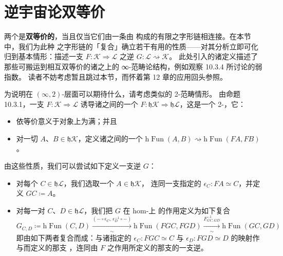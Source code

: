 \providecommand{\Fun}{\operatorname{Fun}}
\providecommand{\QCat}{\mathcal{Q}\mathcal{C}at}

\section{逆宇宙论双等价}\label{sec:inverse-cosmological-biequivalences}

两个\trInfinityCosmos{}是\textbf{双等价的}，当且仅当它们由一条由%
\trCosmologicalBiequivalence{}构成的有限之字形链相连接。在本节中，我们为此种
之字形链的「复合」确立若干有用的性质——对其分析立即可化归到基本情形：描述一支%
\trCosmologicalBiequivalence{} $F\colon\mathcal{K}\Rightarrow\mathcal{L}$ 之逆
$G\colon\mathcal{L}\rightsquigarrow\mathcal{K}$。
此处引入的诸定义描述了那些可搬运到相互双等价的诸\trInfinityCosmos{}之上的%
∞-范畴论结构，例如观察 10.3.4 所讨论的弱指数。
读者不妨考虑暂且跳过本节，而怀着第 12 章的应用回头参照。

为说明在 $(\infty,2)$-\trCategory{}层面可以期待什么，请考虑类似的 2-范畴情形。
由命题 10.3.1，一支\trCosmologicalBiequivalence{} $F\colon\mathcal{K}\Rightarrow\mathcal{L}$
诱导诸\trHomotopyTwoCategory{}之间的一个\trBiequivalence{}
$F\colon\mathfrak{h}\mathcal{K}\Rightarrow\mathfrak{h}\mathcal{L}$，这是一个
2-\trFunctor，它：
\begin{itemize}
\item 依等价意义于对象上为满；并且
\item 对一切 $A$、$B\in\mathfrak{h}\mathcal{K}$，定义诸\trCategory{}之间的一个%
\trLocalEquivalence{} $\mathrm{h}\Fun(A,B)\rightsquigarrow\mathrm{h}\Fun(FA,FB)$。
\end{itemize}

由这些性质，我们可以尝试如下定义一支逆\trBiequivalence{} $G$：
\begin{itemize}
\item 对每个 $C\in\mathfrak{h}\mathcal{L}$，我们选取一个 $A\in\mathfrak{h}\mathcal{K}$，%
连同一支指定的\trEquivalence{} $\epsilon_{C}\colon FA\simeq C$，并定义
$GC\coloneqq A$。
\item 对每一对 $C$、$D\in\mathfrak{h}\mathcal{L}$，我们把 $G$ 在 hom-\trCategory{}上%
的作用定义为如下复合
\begin{equation*}
G_{C,D}\coloneqq\mathrm{h}\Fun(C,D)
\xrightarrow[\ \sim\ ]{(-\circ\epsilon_{C},\,\epsilon_{D}^{-1}\circ-)}
\mathrm{h}\Fun(FGC,FGD)
\xrightarrow[\ \sim\ ]{F_{GC,GD}^{-1}}
\mathrm{h}\Fun(GC,GD)
\end{equation*}
即由如下两者复合而成：与诸指定的\trEquivalence{} $\epsilon_{C}\colon FGC\simeq C$
与 $\epsilon_{D}\colon FGD\simeq D$ 的映射作\trPreComposition{}与\trPostComposition{}而定义的那支%
\trEquivalence，连同由 $F$ 之作用所定义的那支\trEquivalence{}的一支逆。
\end{itemize}

